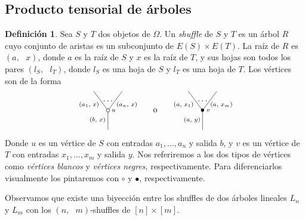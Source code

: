 \documentclass[11pt,a4paper,openright,oneside]{article}
\numberwithin{equation}{section}
\theoremstyle{definition}
\newtheorem{defi}[teo]{Definici\'on}
\begin{document}
\subsection{Producto tensorial de \'arboles}
\begin{defi}
    Sea $S$ y $T$ dos objetos de $\Omega$. Un \emph{shuffle} de $S$ y $T$ es un \'arbol $R$ cuyo conjunto de aristas es un subconjunto de $E(S)\times E(T)$. La ra\'iz de $R$ es $(a,\text{ }x)$, donde $a$ es la ra\'iz de $S$ y $x$ es la ra\'iz de $T$,
    y sus hojas son todos los pares $(l_S,\text{ }l_T)$, donde $l_S$ es una hoja de $S$ y $l_T$ es una hoja de $T$. Los v\'ertices son de la forma
    $$
        \xy
        <0.08cm, 0cm>:
        (0.0, 0.0)*{}="1"; %
        (0.0, 10.0)*\cir<2pt>{}="2"; %
        (-7.5, 20.0)*{}="3"; %
        (7.5, 20.0)*{}="4"; %
        "1";"2" **\dir{-};
        "2";"3" **\dir{-};
        "2";"4" **\dir{-};
        (3.0, 10.0)*=0{\scriptstyle u};
        (-5.5, 5)*=0{\scriptstyle (b,\text{ }x)};
        (-10, 13.0)*=0{\scriptstyle (a_1,\text{ }x)};
        (10, 13.0)*=0{\scriptstyle (a_n,\text{ }x)};
        (0,15)*{\dots};
        \endxy
        \xy
        <0.08cm, 0cm>:
        (-15, 0.0)*{}="1";
        (15, 10.0)*{}="2";
        (0,10)*{\rm o};
        \endxy
        \xy
        <0.08cm, 0cm>:
        (0.0, 0.0)*{}="1"; %
        (0.0, 10.0)*=0{\bullet}="2"; %
        (-7.5, 20.0)*{}="3"; %
        (7.5, 20.0)*{}="4"; %
        "1";"2" **\dir{-};
        "2";"3" **\dir{-};
        "2";"4" **\dir{-};
        (3.0, 10.0)*=0{\scriptstyle v};
        (-5.5, 5)*=0{\scriptstyle (a,\text{ }y)};
        (-10, 13.0)*=0{\scriptstyle (a,\text{ }x_1)};
        (10, 13.0)*=0{\scriptstyle (a,\text{ }x_m)};
        (0,15)*{\dots};
        \endxy
    $$
    Donde $u$ es un v\'ertice de $S$ con entradas $a_1,\dots,a_n$ y salida $b$, y $v$ es un v\'ertice de $T$ con entradas $x_1,\dots,x_m$ y salida $y$. Nos referiremos a los dos tipos de v\'ertices como \emph{v\'ertices blancos} y \emph{v\'ertices negres}, respectivamente. Para diferenciarlos visualmente los pintaremos con $\circ$ y $\bullet$, respectivamente.

    Observamos que existe una biyecci\'on entre los shuffles de dos \'arboles lineales $L_n$ y $L_m$ con los $(n,\text{ }m)$-shuffles de $[n]\times[m]$.
\end{defi}
\end{document}
